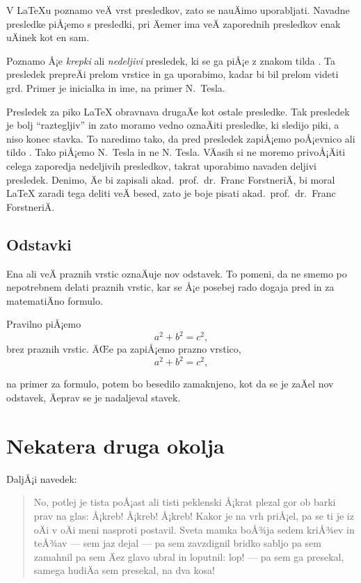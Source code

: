 \documentclass[a4paper]{article}
\begin{document}
V {\LaTeX}u poznamo veÄ vrst presledkov, zato se nauÄimo uporabljati. Navadne presledke
piÅ¡emo s presledki, pri Äemer ima    veÄ      zaporednih presledkov enak uÄinek kot en sam.

Poznamo Å¡e \emph{krepki} ali \emph{nedeljivi} presledek, ki se ga piÅ¡e z znakom tilda
\texttt{}. Ta presledek prepreÄi prelom vrstice in ga uporabimo, kadar bi bil
prelom videti grd. Primer je inicialka in ime, na primer N.~Tesla.

Presledek za piko {\LaTeX} obravnava drugaÄe kot ostale presledke. Tak presledek je bolj
``raztegljiv'' in zato moramo vedno oznaÄiti presledke, ki sledijo piki, a niso konec
stavka. To naredimo tako, da pred presledek zapiÅ¡emo poÅ¡evnico \texttt{} ali tildo
\texttt{}. Tako piÅ¡emo N.~Tesla in ne N. Tesla. VÄasih si ne moremo privoÅ¡Äiti
celega zaporedja nedeljivih presledkov, takrat uporabimo navaden deljivi presledek.
Denimo, Äe bi zapisali akad.~prof.~dr.~Franc ForstneriÄ, bi moral {\LaTeX} zaradi tega
deliti veÄ besed, zato je boje pisati akad.\ prof.\ dr.~Franc ForstneriÄ.






\subsection{Odstavki}

Ena ali veÄ praznih vrstic oznaÄuje nov odstavek. To pomeni, da ne smemo po nepotrebnem
delati praznih vrstic, kar se Å¡e posebej rado dogaja pred in za matematiÄno formulo.

Pravilno piÅ¡emo
\[
   a^2 + b^2 = c^2,
\]
brez praznih vrstic. ÄŒe pa zapiÅ¡emo prazno vrstico,
\[
   a^2 + b^2 = c^2,
\]

na primer za formulo, potem bo besedilo zamaknjeno, kot da se je zaÄel nov odstavek,
Äeprav se je nadaljeval stavek.



\section{Nekatera druga okolja}

DaljÅ¡i navedek:
%
\begin{quote}
  No, potlej je tista poÅ¡ast ali tisti peklenski Å¡krat plezal gor ob barki prav na glas:
  Å¡kreb! Å¡kreb! Å¡kreb! Kakor je na vrh priÅ¡el, pa se ti je iz oÄi v oÄi meni nasproti
  postavil. Sveta mamka boÅ¾ja sedem kriÅ¾ev in teÅ¾av --- sem jaz dejal --- pa sem zavzdignil
  bridko sabljo pa sem zamahnil pa sem Äez glavo ubral in loputnil: lop! --- pa sem ga
  presekal, samega hudiÄa sem presekal, na dva kosa!
\end{quote}
\end{document}
